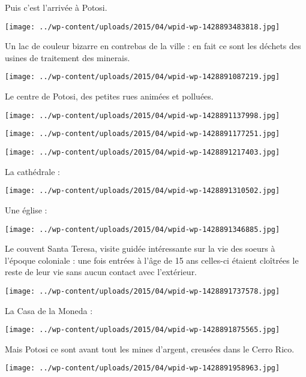  Puis c'est l'arrivée à Potosi.
\begin{center} \texttt{[image: ../wp-content/uploads/2015/04/wpid-wp-1428893483818.jpg]} \end{center}

\pagebreak
 Un lac de couleur bizarre en contrebas de la ville : en fait ce sont les déchets des usines de traitement des minerais.
\begin{center} \texttt{[image: ../wp-content/uploads/2015/04/wpid-wp-1428891087219.jpg]} \end{center}

 Le centre de Potosi, des petites rues animées et polluées. 
\begin{center} \texttt{[image: ../wp-content/uploads/2015/04/wpid-wp-1428891137998.jpg]} \end{center}
\begin{center} \texttt{[image: ../wp-content/uploads/2015/04/wpid-wp-1428891177251.jpg]} \end{center}
\begin{center} \texttt{[image: ../wp-content/uploads/2015/04/wpid-wp-1428891217403.jpg]} \end{center}

\pagebreak
  La cathédrale :
\begin{center} \texttt{[image: ../wp-content/uploads/2015/04/wpid-wp-1428891310502.jpg]} \end{center}

  Une église :
\begin{center} \texttt{[image: ../wp-content/uploads/2015/04/wpid-wp-1428891346885.jpg]} \end{center}

 Le couvent Santa Teresa, visite guidée intéressante sur la vie des soeurs à l'époque coloniale : une fois entrées à l'âge de 15 ans celles-ci étaient cloîtrées le reste de leur vie sans aucun contact avec l'extérieur. 
\begin{center} \texttt{[image: ../wp-content/uploads/2015/04/wpid-wp-1428891737578.jpg]} \end{center}

 La Casa de la Moneda :
\begin{center} \texttt{[image: ../wp-content/uploads/2015/04/wpid-wp-1428891875565.jpg]} \end{center}

 Mais Potosi ce sont avant tout les mines d'argent, creusées dans le Cerro Rico.
\begin{center} \texttt{[image: ../wp-content/uploads/2015/04/wpid-wp-1428891958963.jpg]} \end{center}

